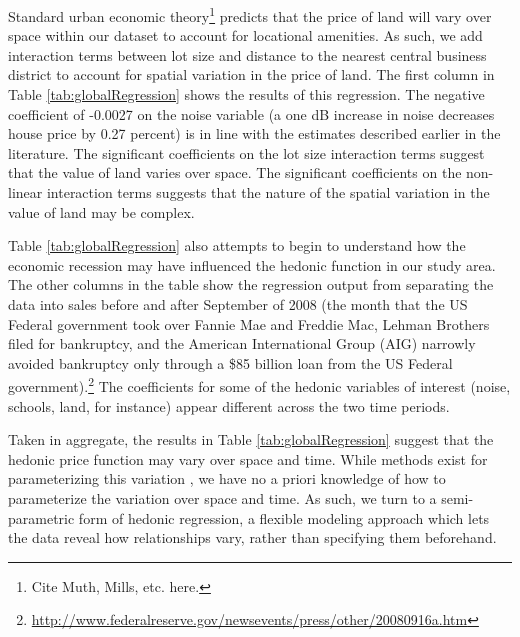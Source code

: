 \documentclass{article}\usepackage{graphicx, color}
\begin{document}
Standard urban economic theory\footnote{Cite Muth, Mills, etc. here.} predicts that the price of land will vary over space within our dataset to account for locational amenities. As such, we add interaction terms between lot size and distance to the nearest central business district to account for spatial variation in the price of land. The first column in Table \ref{tab:globalRegression} shows the results of this regression. The negative coefficient of -0.0027 on the noise variable (a one dB increase in noise decreases house price by 0.27 percent) is in line with the estimates described earlier in the literature. The significant coefficients on the lot size interaction terms suggest that the value of land varies over space. The significant coefficients on the non-linear interaction terms suggests that the nature of the spatial variation in the value of land may be complex.

Table \ref{tab:globalRegression} also attempts to begin to understand how the economic recession may have influenced the hedonic function in our study area. The other columns in the table show the regression output from separating the data into sales before and after September of 2008 (the month that the US Federal government took over Fannie Mae and Freddie Mac, Lehman Brothers filed for bankruptcy, and the American International Group (AIG) narrowly avoided bankruptcy only through a \$85 billion loan from the US Federal government).\footnote{\url{http://www.federalreserve.gov/newsevents/press/other/20080916a.htm}} The coefficients for some of the hedonic variables of interest (noise, schools, land, for instance) appear different across the two time periods.

Taken in aggregate, the results in Table \ref{tab:globalRegression} suggest that the hedonic price function may vary over space and time. While methods exist for parameterizing this variation \citep[such as spatial expansion as suggested by][]{Casetti1972}, we have no a priori knowledge of how to parameterize the variation over space and time. As such, we turn to a semi-parametric form of hedonic regression, a flexible modeling approach which lets the data reveal how relationships vary, rather than specifying them beforehand.
\end{document}
